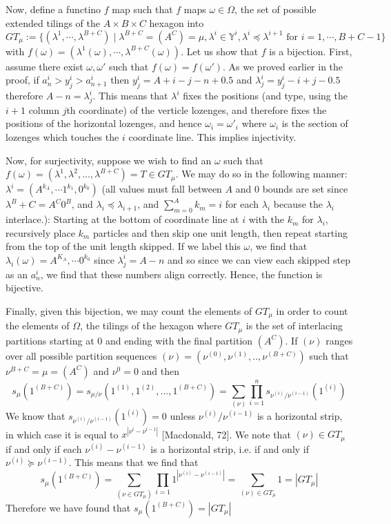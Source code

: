 \documentclass[12pt]{article}
\begin{document}
	Now, define a functino $f$ map such that $f$ maps $\omega\in \Omega$, the set of possible extended tilings of the $A\times B \times C$ hexagon into $$GT_\mu:=\{(\lambda^1,\cdots,\lambda^{B+C})\mid \lambda^{B+C}=(A^C)=\mu, \lambda^i\in \mathbb{Y}^i, \lambda^i\preceq \lambda^{i+1} \text{ for } i=1, \cdots , B+C-1\}$$ with $f(\omega)=(\lambda^1(\omega), \cdots, \lambda^{B+C}(\omega))$. 
	Let us show that $f$ is a bijection. First, assume there exist $\omega, \omega'$ such that $f(\omega)=f(\omega')$. 
	As we proved earlier in the proof, if $a_n^i>y_j^i>a_{n+1}^i$ then $y_j^i=A+i-j-n+0.5$ and $\lambda_j^i=y_j^i-i+j-0.5$ therefore $A-n=\lambda_j^i$. 
	This means that $\lambda^i$ fixes the positions (and type, using the $i+1$ column $j$th coordinate) of the verticle lozenges, and therefore fixes the positions of the horizontal lozenges, and hence $\omega_i=\omega'_i$ where $\omega_i$ is the section of lozenges which touches the $i$ coordinate line. 
	This implies injectivity. 
	
	Now, for surjectivity, suppose we wish to find an $\omega$ such that $f(\omega)=(\lambda^1, \lambda^2,...,\lambda^{B+C})=T\in GT_\mu$. 
	We may do so in the following manner: $\lambda^i=(A^{k_A}, \cdots 1^{k_1}, 0^{k_0} )$ (all values must fall between $A$ and $0$ bounds are set since $\lambda^B+C=A^C0^B$, and $\lambda_i\preceq \lambda_{i+1}$, and $\sum_{m=0}^A k_m=i$ for each $\lambda_i$ because the $\lambda_i$ interlace.): Starting at the bottom of coordinate line at $i$ with the $k_m$ for $\lambda_i$, recursively place $k_m$ particles and then skip one unit length, then repeat starting from the top of the unit length skipped. 
	If we label this $\omega$, we find that $\lambda_i(\omega)=A^{K_A},\cdots 0^{k_0}$ since $\lambda_j^i=A-n$ and so since we can view each skipped step as an $a_n^i$, we find that these numbers align correctly. Hence, the function is bijective.
	
	
	Finally, given this bijection, we may count the elements of $GT_\mu$ in order to count the elements of $\Omega$, the tilings of the hexagon where $GT_\mu$ is the set of interlacing partitions starting at $0$ and ending with the final partition $(A^C)$. If $(\nu)$ ranges over all possible partition sequences $(\nu)=(\nu^{(0)},\nu^{(1)},..,\nu^{(B+C)})$ such that $\nu^{B+C}=\mu = (A^C)$ and $\nu^0=0$ and  then $$s_\mu(1^{(B+C)})=s_{\mu/\nu}(1^{(1)},1^{(2)},...,1^{(B+C)})=\sum_{(\nu)}\prod_{i=1}^n s_{\nu^{(i)}/\nu^{(i-1)}}(1^{(i)})$$
	We know that $s_{\nu^{(i)}/\nu^{(i-1)}}(1^{(i)})=0$ unless $\nu^{(i)}/\nu^{(i-1)}$ is a horizontal strip, in which case it is equal to $x^{|\nu^{i}-\nu^{i-1}|}$ [Macdonald, 72]. 
	We note that $(\nu)\in GT_\mu$ if and only if each $\nu^{(i)}-\nu^{(i-1)}$ is a horizontal strip, i.e. if and only if $\nu^{(i)}\succeq \nu^{(i-1)}$. 
	This means that we find that $$s_\mu(1^{(B+C)})=\sum_{(\nu\in GT_\mu)}\prod_{i=1} 1^{|\nu^{(i)}-\nu^{(i-1)}|}=\sum_{(\nu)\in GT_\mu} 1=|GT_\mu|$$ Therefore we have found that $s_\mu(1^{(B+C)})=|GT_\mu|$
	
\end{document}
